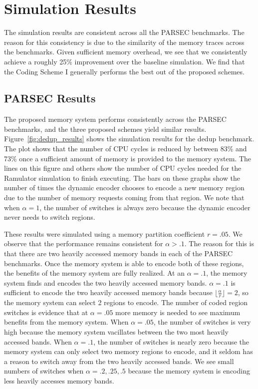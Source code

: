 \section{Simulation Results}
\label{sec:simulation}
The simulation results are consistent across all the PARSEC benchmarks. The reason for this consistency is due to the similarity of the memory traces across the benchmarks. Given sufficient memory overhead, we see that we consistently achieve a roughly 25\% improvement over the baseline simulation. We find that the Coding Scheme I generally performs the best out of the proposed schemes. 

\subsection{PARSEC Results}

The proposed memory system performs consistently across the PARSEC benchmarks, and the three proposed schemes yield similar results. Figure~\ref{fig:dedup_results} shows the simulation results for the dedup benchmark. The plot shows that the number of CPU cycles is reduced by between 83\% and 73\% once a sufficient amount of memory is provided to the memory system. The lines on this figure and others show the number of CPU cycles needed for the Ramulator simulation to finish executing. The bars on these graphs show the number of times the dynamic encoder chooses to encode a new memory region due to the number of memory requests coming from that region. We note that when $\alpha = 1$, the number of switches is always zero because the dynamic encoder never needs to switch regions.

These results were simulated using a memory partition coefficient $r = .05$. We observe that the performance remains consistent for $\alpha > .1$. The reason for this is that there are two heavily accessed memory bands in each of the PARSEC benchmarks. Once the memory system is able to encode both of these regions, the benefits of the memory system are fully realized. At an $\alpha = .1$, the memory system finds and encodes the two heavily accessed memory bands. $\alpha = .1$ is sufficient to encode the two heavily accessed memory bands because $\lfloor\frac{\alpha}{r}\rfloor = 2$, so the memory system can select 2 regions to encode. The number of coded region switches is evidence that at $\alpha = .05$ more memory is needed to see maximum benefits from the memory system. When $\alpha = .05$, the number of switches is very high because the memory system vacillates between the two most heavily accessed bands. When $\alpha = .1$, the number of switches is nearly zero because the memory system can only select two memory regions to encode, and it seldom has a reason to switch away from the two heavily accessed bands. We see small numbers of switches when $\alpha = {.2, .25, .5}$ because the memory system is encoding less heavily accesses memory bands.

